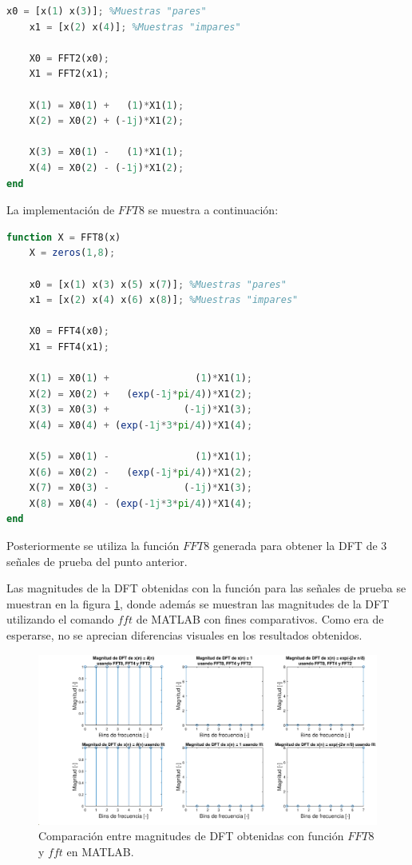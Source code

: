 \begin{enumerate}
\begin{lstlisting}[language = octave]
    x0 = [x(1) x(3)]; %Muestras "pares"
    x1 = [x(2) x(4)]; %Muestras "impares"
    
    X0 = FFT2(x0);
    X1 = FFT2(x1);
    
    X(1) = X0(1) +   (1)*X1(1);
    X(2) = X0(2) + (-1j)*X1(2);    
    
    X(3) = X0(1) -   (1)*X1(1);
    X(4) = X0(2) - (-1j)*X1(2);    
end
\end{lstlisting}

La implementación de $FFT8$ se muestra a continuación:
\begin{lstlisting}[language = octave]
function X = FFT8(x)
    X = zeros(1,8);
    
    x0 = [x(1) x(3) x(5) x(7)]; %Muestras "pares"
    x1 = [x(2) x(4) x(6) x(8)]; %Muestras "impares"
    
    X0 = FFT4(x0);
    X1 = FFT4(x1);
    
    X(1) = X0(1) +               (1)*X1(1);
    X(2) = X0(2) +   (exp(-1j*pi/4))*X1(2);
    X(3) = X0(3) +             (-1j)*X1(3);
    X(4) = X0(4) + (exp(-1j*3*pi/4))*X1(4);
    
    X(5) = X0(1) -               (1)*X1(1);
    X(6) = X0(2) -   (exp(-1j*pi/4))*X1(2);
    X(7) = X0(3) -             (-1j)*X1(3);
    X(8) = X0(4) - (exp(-1j*3*pi/4))*X1(4);
end
\end{lstlisting}

Posteriormente se utiliza la función $FFT8$ generada para obtener la DFT de 3 señales de prueba del punto anterior.

Las magnitudes de la DFT obtenidas con la función para las señales de prueba se muestran en la figura \ref{p6_2dft}, donde además se muestran las magnitudes de la DFT utilizando el comando $fft$ de MATLAB con fines comparativos. Como era de esperarse, no se aprecian diferencias visuales en los resultados obtenidos.

\begin{figure}[H]
    \centering
    \includegraphics[width = .98 \linewidth]{Figuras/p6_2dft.eps}
    \caption{Comparación entre magnitudes de DFT obtenidas con función $FFT8$ y $fft$ en MATLAB.}
    \label{p6_2dft}
\end{figure}


\end{enumerate}

